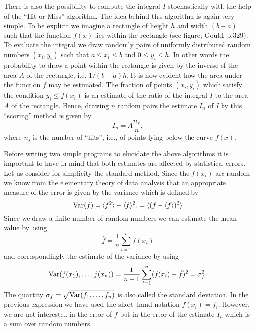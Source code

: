 There is also the possibility to compute the integral $I$
stochastically
with the help of the ``Hit or Miss'' algorithm. The idea behind
this algorithm is again very simple. To be explicit we imagine a rectangle
of height $h$ and width $(b-a)$ such that the function $f(x)$ lies
within the rectangle (see figure; Gould, p.329). To evaluate the
integral we draw randomly pairs of uniformly distributed random
numbers $(x_i,y_i)$ such that $a \le x_i \le b$ and $0 \le y_i \le h$.
In other words the probability to draw a point within the rectangle is
given by the inverse of the area $A$ of the rectangle,
i.e. $1/(b-a)h$. It is now evident how the area under the
function $f$ may be estimated. The fraction of points $(x_i,y_i)$
which satisfy the condition $y_i \le f(x_i)$ is an estimate of the
ratio of the integral $I$ to the area $A$ of the rectangle. Hence,
drawing $n$ random pairs the estimate $I_n$ of $I$ by this ``scoring''
method is given by
\begin{equation}
I_n = A \frac{n_s}{n},
\end{equation}
where $n_s$ is the number of ``hits'', i.e., of points lying below the
curve $f(x)$.

Before writing two simple programs to elucidate the above algorithms
it is important to have in mind that both estimates are affected by
statistical errors. Let us consider for simplicity 
the standard method. Since the $f(x_i)$ are random we know 
from the elementary theory of data analysis
that an appropriate measure of the error is given by the variance
which is defined by
\begin{equation}
{\rm Var}(f) = \langle f^2 \rangle - \langle f \rangle^2.
= \langle (f -\langle f \rangle)^2 \rangle
\end{equation}
Since we draw a finite number of random numbers we can
estimate the mean value by using
\begin{equation}
\hat{f}  = \frac{1}{n} \sum_{i=1}^n f(x_i) 
\end{equation}
and correspondingly the estimate of the variance by using
\begin{equation}
{\rm Var}(f(x_1),\ldots, f(x_n)) = \frac{1}{n-1} \sum_{i=1}^n 
   (f(x_i)- \hat{f})^2 = \sigma_f^2.
\end{equation}
The quantity $\sigma_f = \sqrt{{\rm Var}(f_1, \ldots, f_n)}$ 
is also called the standard deviation. In the previous expression
we have used the short--hand
notation $f(x_i) = f_i$. However,
we are not interested in the error of $f$ but in the error of the
estimate $I_n$ which is a sum over random numbers. 

